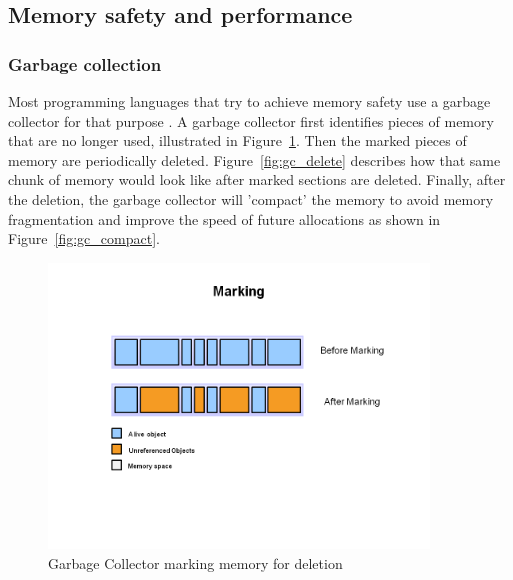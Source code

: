 \subsection{Memory safety and performance}

\subsubsection{Garbage collection}

Most programming languages that try to achieve memory safety use a garbage collector for that purpose \cite{java_garbage_collector}.
A garbage collector first identifies pieces of memory that are no longer used, illustrated in Figure~\ref{fig:gc_mark}.
Then the marked pieces of memory are periodically deleted. Figure~\ref{fig:gc_delete} describes how that same chunk of memory would look like after marked sections are deleted.
Finally, after the deletion, the garbage collector will 'compact' the memory to avoid memory fragmentation and improve the speed of future allocations as shown in Figure~\ref{fig:gc_compact}.

\begin{figure}[htb]
    \centering
    \includegraphics[width=0.9\textwidth]{figures/fundamentals_garbage_collector_marking.PNG}
    \caption[Illustration: Garbage Collector marking memory for deletion \cite{java_garbage_collector}]{Garbage Collector marking memory for deletion}
    \label{fig:gc_mark}
\end{figure}

